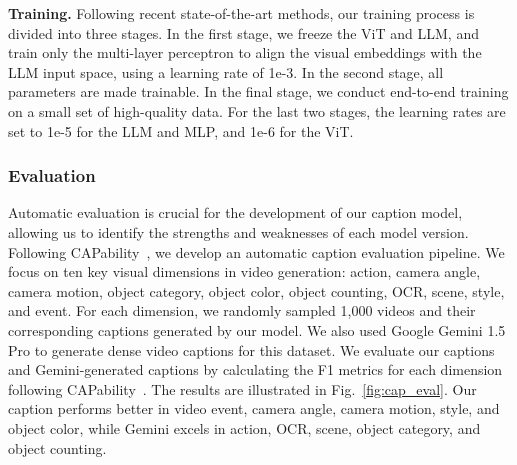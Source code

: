 \textbf{Training.} Following recent state-of-the-art methods, our training process is divided into three stages.
In the first stage, we freeze the ViT and LLM, and train only the multi-layer perceptron to align the visual embeddings with the LLM input space, using a learning rate of 1e-3.
In the second stage, all parameters are made trainable.
In the final stage, we conduct end-to-end training on a small set of high-quality data.
For the last two stages, the learning rates are set to 1e-5 for the LLM and MLP, and 1e-6 for the ViT.

\subsubsection{Evaluation}
Automatic evaluation is crucial for the development of our caption model, allowing us to identify the strengths and weaknesses of each model version.
Following CAPability~\citep{liu2025good}, we develop an automatic caption evaluation pipeline.
We focus on ten key visual dimensions in video generation: action, camera angle, camera motion, object category, object color, object counting, OCR, scene, style, and event.
For each dimension, we randomly sampled 1,000 videos and their corresponding captions generated by our model.
We also used Google Gemini 1.5 Pro to generate dense video captions for this dataset.
We evaluate our captions and Gemini-generated captions by calculating the F1 metrics for each dimension following CAPability~\citep{liu2025good}.
The results are illustrated in Fig.~\ref{fig:cap_eval}.
Our caption performs better in video event, camera angle, camera motion, style, and object color, while Gemini excels in action, OCR, scene, object category, and object counting.